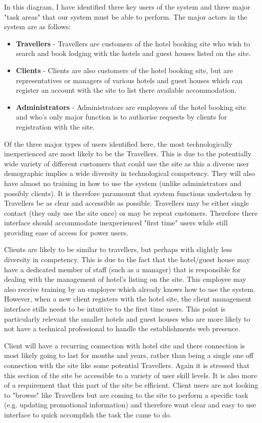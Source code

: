 \documentclass{article}
\begin{document}
In this diagram, I have identified three key users of the system and three major "task areas" that our system must be able to perform. The major actors in the system are as follows:
\begin{itemize}
	\item \textbf{Travellers} - Travellers are customers of the hotel booking site who wish to search and book lodging with the hotels and guest houses listed on the site.
	\item \textbf{Clients} - Clients are also customers of the hotel booking site, but are representatives or managers of various hotels and guest houses which can register an account with the site to list there available accommodation.
	\item \textbf{Administrators} - Administrators are employees of the hotel booking site and who's only major function is to authorise requests by clients for registration with the site.
\end{itemize}

Of the three major types of users identified here, the most technologically inexperienced are most likely to be the Travellers. This is due to the potentially wide variety of different customers that could use the site as this a diverse user demographic implies a wide diversity in technological competency. They  will also have almost no training in how to use the system (unlike administrators and possibly clients). It is therefore paramount that system functions undertaken by Travellers be as clear and accessible as possible. Travellers may be either single contact (they only use the site once) or may be repeat customers. Therefore there interface should accommodate inexperienced "first time" users while still providing ease of access for power users.

Clients are likely to be similar to travellers, but perhaps with slightly less diversity in competency. This is due to the fact that the hotel/guest house may have a dedicated member of staff (such as a manager) that is responsible for dealing with the management of hotel's listing on the site. This employee may also receive training by an employee which already knows how to use the system. However, when a new client registers with the hotel site, the client management interface stills needs to be intuitive to the first time users. This point is particularly relevant the smaller hotels and guest houses who are more likely to not have a technical professional to handle the establishments web presence.

Client will have a recurring connection with hotel site and there connection is most likely going to last for months and years, rather than being a single one off connection with the site like some potential Travellers. Again it is stressed that this section of the site be accessible to a variety of user skill levels. It is also more of a requirement that this part of the site be efficient. Client users are not looking to "browse" like Travellers but are coming to the site to perform a specific task (e.g. updating promotional information) and therefore want clear and easy to use interface to quick accomplish the task the came to do.
\end{document}
